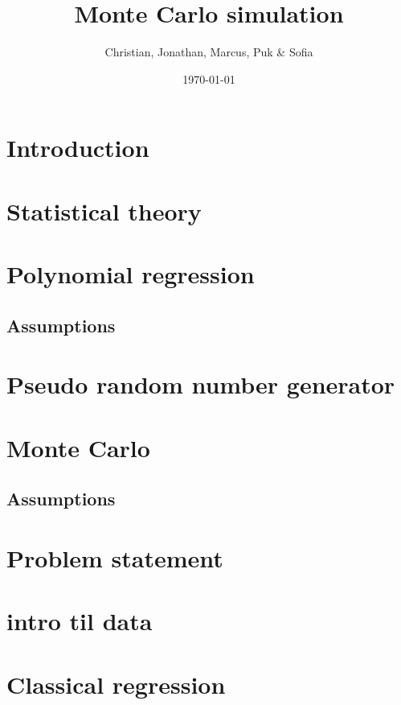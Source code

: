 \documentclass{article}
\title{Monte Carlo simulation}
\author{Christian, Jonathan, Marcus, Puk \& Sofia }
\date{\today}
\begin{document}
	\setcounter{section}{0}
	\maketitle
	\newpage
	\tableofcontents
	\newpage
	
	\section{Introduction}
	
	\newpage
	
	\section{Statistical theory}
	
	\newpage
	
	\section{Polynomial regression}
	\newpage
	
	\subsection{Assumptions}
	\newpage
	
	\section{Pseudo random number generator}
	
	\newpage
	
	\section{Monte Carlo}
	\subsection{Assumptions}
	\newpage
	
	\section{Problem statement}
	\newpage
	\section{intro til data}
	
	\newpage
	\section{Classical regression}
	\newpage
	
\end{document}
